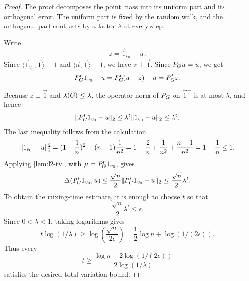 \begin{proof}
	The proof decomposes the point mass into its uniform part and its orthogonal error. The uniform part is fixed by the random walk, and the orthogonal part contracts by a factor \(\lambda\) at every step.

	Write
	\begin{equation}
		z=\vec{1}_{v_0}-\vec{u}.
	\end{equation}
	Since \(\langle\vec{1}_{v_0},\vec{1}\rangle=1\) and \(\langle\vec{u},\vec{1}\rangle=1\), we have \(z\perp\vec{1}\). Since \(P_{G}u=u\), we get
	\begin{equation}
		P_{G}^t1_{v_0}-u
		=
		P_{G}^t(u+z)-u
		=
		P_{G}^t z.
	\end{equation}
	Because \(z\perp\vec{1}\) and \(\lambda(G)\leq \lambda\), the operator norm of \(P_{G}\) on \(\vec{1}^{\perp}\) is at most \(\lambda\), and hence
	\begin{equation}
		\lVert P_{G}^t1_{v_0}-u\rVert_2\leq \lambda^t\lVert1_{v_0}-u\rVert_2\leq \lambda^t.
	\end{equation}
	The last inequality follows from the calculation
	\begin{equation}
		\lVert1_{v_0}-u\rVert_2^2
		=
		(1-\frac{1}{n})^2+(n-1)\frac{1}{n^2}
		=
		1-\frac{2}{n}+\frac{1}{n^2}+\frac{n-1}{n^2}
		=
		1-\frac{1}{n}
		\leq 1.
	\end{equation}
	Applying \cref{lem:l2-tv}, with \(\mu=P_{G}^t1_{v_0}\), gives
	\begin{equation}
		\Delta(P_{G}^t1_{v_0},u)
		\leq
		\frac{\sqrt{n}}{2}\lVert P_{G}^t1_{v_0}-u\rVert_2
		\leq
		\frac{\sqrt{n}}{2}\lambda^t.
	\end{equation}
	To obtain the mixing-time estimate, it is enough to choose \(t\) so that
	\begin{equation}
		\frac{\sqrt{n}}{2}\lambda^t\leq \epsilon.
	\end{equation}
	Since \(0<\lambda<1\), taking logarithms gives
	\begin{equation}
		t\log(1/\lambda)\geq \log\left(\frac{\sqrt{n}}{2\epsilon}\right)
		=
		\frac{1}{2}\log n+\log(1/(2\epsilon)).
	\end{equation}
	Thus every
	\begin{equation}
		t\geq \frac{\log n+2\log(1/(2\epsilon))}{2\log(1/\lambda)}
	\end{equation}
	satisfies the desired total-variation bound.
\end{proof}

